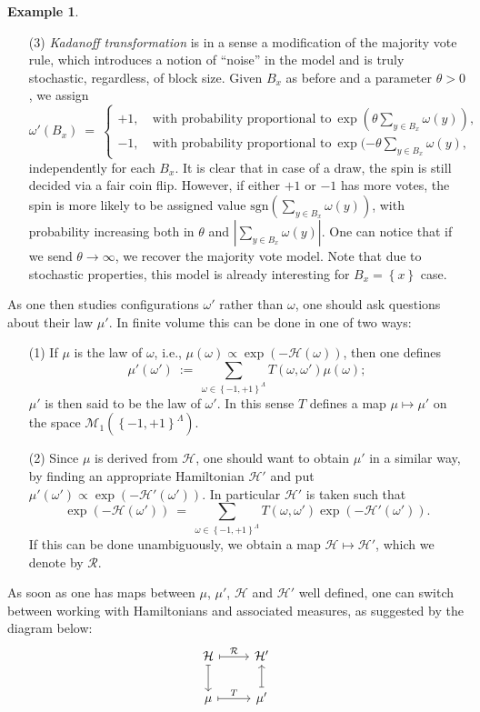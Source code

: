 \documentclass[12pt]{article}
\renewcommand{\H}{\mathcal{H}}
\newcommand{\M}{\mathcal{M}}
\newcommand{\RR}{\mathcal{R}}
\newcommand{\set}[1]{\left\{#1\right\}}
\newcommand{\ra}{\rightarrow}
\newcommand{\1}{\mathbbm{1}}
\newcommand{\5}{\vspace{0.5cm}}
\theoremstyle{definition}
\newtheorem{ex}[thm]{Example}
\begin{document}
\begin{ex}
\begin{itemize}
	\item[(3)] \textit{Kadanoff transformation} is in a sense a modification of the majority vote rule, which introduces a notion of ``noise'' in the model and is truly stochastic, regardless, of block size. Given $B_x$ as before and a parameter $\theta>0$, we assign
	$$\omega'(B_x) ~=~ \begin{cases}
	+1, ~&\text{with probability proportional to}~\exp(\theta\sum_{y\in B_x}\omega(y)), \\
	-1, ~&\text{with probability proportional to}~\exp(-\theta\sum_{y\in B_x}\omega(y),
	\end{cases}$$
	independently for each $B_x$. It is clear that in case of a draw, the spin is still decided via a fair coin flip. However, if either $+1$ or $-1$ has more votes, the spin is more likely to be assigned value $\mathrm{sgn}(\sum_{y\in B_x}\omega(y))$, with probability increasing both in $\theta$ and $|\sum_{y\in B_x}\omega(y)|$. One can notice that if we send $\theta\ra\infty$, we recover the majority vote model. Note that due to stochastic properties, this model is already interesting for $B_x=\set{x}$ case.
\end{itemize}
\end{ex}

As one then studies configurations $\omega'$ rather than $\omega$, one should ask questions about their law $\mu'$. In finite volume this can be done in one of two ways:
\begin{itemize}
	\item[(1)] If $\mu$ is the law of $\omega$, i.e., $\mu(\omega)\propto\exp(-\H(\omega))$, then one defines
	$$\mu'(\omega') ~:=~ \sum_{\omega\in\set{-1,+1}^\Lambda}T(\omega,\omega')\mu(\omega);$$
	$\mu'$ is then said to be the law of $\omega'$. In this sense $T$ defines a map $\mu\mapsto\mu'$ on the space $\M_1(\set{-1,+1}^\Lambda)$.
	\item[(2)] Since $\mu$ is derived from $\H$, one should want to obtain $\mu'$ in a similar way, by finding an appropriate Hamiltonian $\H'$ and put $\mu'(\omega')\propto\exp(-\H'(\omega'))$. In particular $\H'$ is taken such that
	$$\exp(-\H(\omega')) ~=~ \sum_{\omega\in\set{-1,+1}^{\Lambda}}T(\omega,\omega')\exp(-\H'(\omega')).$$
	If this can be done unambiguously, we obtain a map $\H\mapsto\H'$, which we denote by $\RR$.
\end{itemize}

As soon as one has maps between $\mu$, $\mu'$, $\H$ and $\H'$ well defined, one can switch between working with Hamiltonians and associated measures, as suggested by the diagram below:
\begin{equation}\label{RGdiagram}
\begin{tikzcd}
    \H \arrow[r, mapsto, "\RR"] \arrow[d, mapsto] & \H' \\
    \mu \arrow[r, mapsto, "T"] & \mu' \arrow[u, mapsto]
\end{tikzcd}
\end{equation}
\end{document}

